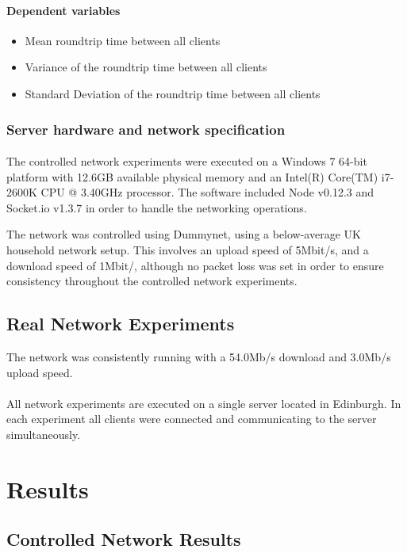 \documentclass[bsc,frontabs,twoside,singlespacing,parskip,deptreport]{infthesis}     %
\begin{document}
\paragraph{Dependent variables}
\begin{itemize}
\item Mean roundtrip time between all clients
\item Variance of the roundtrip time between all clients
\item Standard Deviation of the roundtrip time between all clients
\end{itemize}

\subsubsection{Server hardware and network specification}
\paragraph{}The controlled network experiments were executed on a Windows 7 64-bit platform with 12.6GB available physical memory and an Intel(R) Core(TM) i7-2600K CPU @ 3.40GHz processor. The software included Node v0.12.3 and Socket.io v1.3.7 in order to handle the networking operations.

The network was controlled using Dummynet, using a below-average UK household network setup. This involves an upload speed of 5Mbit/s, and a download speed of 1Mbit/, although no packet loss was set in order to ensure consistency throughout the controlled network experiments.

\subsection{Real Network Experiments}
The network was consistently running with a 54.0Mb/s download and 3.0Mb/s upload speed.
\paragraph{}All network experiments are executed on a single server located in Edinburgh. In each experiment all clients were connected and communicating to the server simultaneously.



\section{Results}
\subsection{Controlled Network Results}
\end{document}
